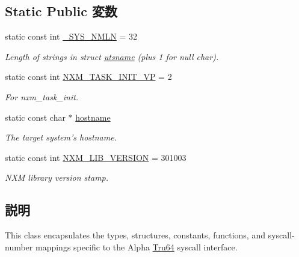 \subsection*{Static Public 変数}
\begin{DoxyCompactItemize}
\item 
static const int \hyperlink{classTru64_a1a19d4c9718c9a4ad5fa2e48271fccc9}{\_\-SYS\_\-NMLN} = 32
\begin{DoxyCompactList}\small\item\em Length of strings in struct \hyperlink{structTru64_1_1utsname}{utsname} (plus 1 for null char). \item\end{DoxyCompactList}\item 
static const int \hyperlink{classTru64_a284276950ab5fbb4ed5432a4fe77c0b4}{NXM\_\-TASK\_\-INIT\_\-VP} = 2
\begin{DoxyCompactList}\small\item\em For nxm\_\-task\_\-init. \item\end{DoxyCompactList}\item 
static const char $\ast$ \hyperlink{classTru64_aad01339e89106fdf68f57ef118956fa9}{hostname}
\begin{DoxyCompactList}\small\item\em The target system's hostname. \item\end{DoxyCompactList}\item 
static const int \hyperlink{classTru64_a42f5e6243e70c3d99afed9a0ab5ac3c1}{NXM\_\-LIB\_\-VERSION} = 301003
\begin{DoxyCompactList}\small\item\em NXM library version stamp. \item\end{DoxyCompactList}\end{DoxyCompactItemize}


\subsection{説明}
This class encapsulates the types, structures, constants, functions, and syscall-\/number mappings specific to the Alpha \hyperlink{classTru64}{Tru64} syscall interface. 

